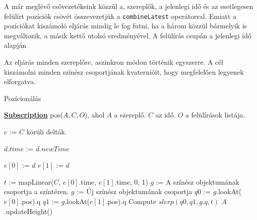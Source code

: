 A már meglévő csővezetékeink közzül a, szereplők, a jelenlegi idő és az esetlegesen felülírt pozíciók csövét összevezetjük a \lstinline[columns=fixed]{combineLatest} operátorral. Emiatt a pozíciókat kiszámoló eljárás mindig le fog futni, ha a három közzül bármelyik is megváltozik, a másik kettő utolsó eredményével. A felülírás csupán a jelenlegi idő alapján

Az eljárás minden szereplőre, aszinkron módon történik egyszerre. A cél kiszámolni minden színész csoportjának kvaternióit\cite{Quaternion}, hogy megfelelően legyenek elforgatva.

\begin{algorithm}[H]
	\caption{Pozícionálás}
	\label{alg:ibb}
	\textbf{\underline{Subscription}} pos($A, C, O$), ahol $A$ a szereplő. $C$ az idő. $O$ a felülírások listája.
	\begin{algorithmic}[1] %
	\STATE $e$ := $C$ körüli delták.

					\STATE $d.time$ := $d.newTime$
				\ENDIF
			\ENDFOR

				\STATE $e[0]$ := $d$
			\ENDIF
				\STATE $e[1]$ := $d$
			\ENDIF

		\ENDFOR
	\ENDIF

	\STATE $t$ := mapLinear($C$, $e[0]$.time, $e[1]$.time, 0, 1)
	\STATE $g$ := A színész objektumának csoportja a színtéren.  
		\STATE $g$ := Új színész objektumának csoportja
	\ENDIF
	\STATE $q0$ := $g$.lookAt($e[0]$.pos).q 
	\STATE $q1$ := $g$.lookAt($e[1]$.pos).q 
		\STATE Compute $slerp(q0, q1, g.q, t)$ 
	\ENDIF  {}
	\STATE $A$.updateHeight() 
	\end{algorithmic}
\end{algorithm}











